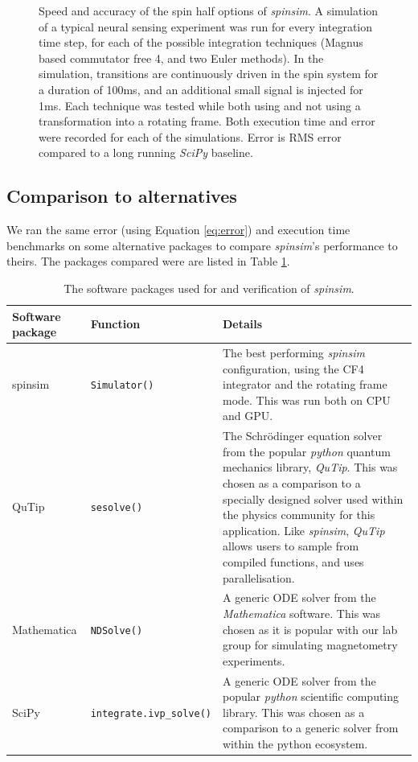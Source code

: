 \documentclass{jors}
\begin{document}
\begin{figure}[h!]
\begin{subfigure}[b]{0.475\textwidth}
				\caption{}
				\label{fig:benchmark_spin_half_execution_error}
			\end{subfigure}
			\caption{Speed and accuracy of the spin half options of \emph{spinsim}.
			A simulation of a typical neural sensing experiment was run for every integration time step, for each of the possible integration techniques (Magnus based commutator free 4, and two Euler methods).
			In the simulation, transitions are continuously driven in the spin system for a duration of 100ms, and an additional small signal is injected for 1ms.
			Each technique was tested while both using and not using a transformation into a rotating frame.
			Both execution time and error were recorded for each of the simulations.
			Error is RMS error compared to a long running \emph{SciPy} baseline.}
			\label{fig:benchmark_spin_half}
		\end{figure}

	\subsection{Comparison to alternatives}
		We ran the same error (using Equation \eqref{eq:error}) and execution time benchmarks on some alternative packages to compare \emph{spinsim}'s performance to theirs.
		The packages compared were are listed in Table \ref{tab:external}.
		\begin{table}[h!]
			\caption{The software packages used for and verification of \emph{spinsim}.}
			\label{tab:external}
			\begin{tabular}{l|l|p{6.5cm}}
				\textbf{Software package}									&\textbf{Function}					&\textbf{Details}\\
				\hline
				spinsim														&\texttt{Simulator()}				&The best performing \emph{spinsim} configuration, using the CF4 integrator and the rotating frame mode. This was run both on CPU and GPU.
				\\
				\hline
				QuTip \cite{johansson_qutip_2013}							&\texttt{sesolve()}					&The Schr\"odinger equation solver from the popular \emph{python} quantum mechanics library, \emph{QuTip}.
				This was chosen as a comparison to a specially designed solver used within the physics community for this application.
				Like \emph{spinsim}, \emph{QuTip} allows users to sample from compiled functions, and uses parallelisation.\\
				\hline
				Mathematica \cite{wolfram_research_inc_mathematica_2020}	&\texttt{NDSolve()}					&A generic ODE solver from the \emph{Mathematica} software.
				This was chosen as it is popular with our lab group for simulating magnetometry experiments.\\
				\hline
				SciPy \cite{virtanen_scipy_2020}							&\texttt{integrate.ivp\_solve()}	&A generic ODE solver from the popular \emph{python} scientific computing library.
				This was chosen as a comparison to a generic solver from within the python ecosystem.
			\end{tabular}
		\end{table}
\end{document}
